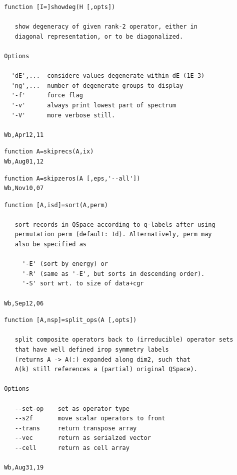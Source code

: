 \documentclass[twoside,12pt]{article}
\begin{document}
\pagebreak[3]



\begin{verbatim}
  function [I=]showdeg(H [,opts])
 
     show degeneracy of given rank-2 operator, either in 
     diagonal representation, or to be diagonalized.
 
  Options
 
    'dE',...  considere values degenerate within dE (1E-3)
    'ng',...  number of degenerate groups to display
    '-f'      force flag
    '-v'      always print lowest part of spectrum
    '-V'      more verbose still.
 
  Wb,Apr12,11
\end{verbatim}

\pagebreak[3]



\begin{verbatim}
  function A=skiprecs(A,ix)
  Wb,Aug01,12
\end{verbatim}

\pagebreak[3]



\begin{verbatim}
  function A=skipzeros(A [,eps,'--all'])
  Wb,Nov10,07
\end{verbatim}

\pagebreak[3]



\begin{verbatim}
  function [A,isd]=sort(A,perm)
 
     sort records in QSpace according to q-labels after using
     permutation perm (default: Id). Alternatively, perm may
     also be specified as 
 
       '-E' (sort by energy) or
       '-R' (same as '-E', but sorts in descending order).
       '-S' sort wrt. to size of data+cgr
 
  Wb,Sep12,06
\end{verbatim}

\pagebreak[3]



\begin{verbatim}
  function [A,nsp]=split_ops(A [,opts])
 
     split composite operators back to (irreducible) operator sets
     that have well defined irop symmetry labels
     (returns A -> A(:) expanded along dim2, such that
     A(k) still references a (partial) original QSpace).
 
  Options
 
     --set-op    set as operator type
     --s2f       move scalar operators to front
     --trans     return transpose array
     --vec       return as serialzed vector
     --cell      return as cell array
 
  Wb,Aug31,19
\end{verbatim}
\end{document}
